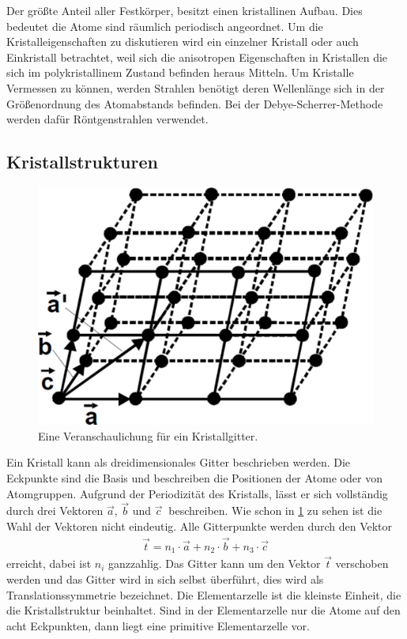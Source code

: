 Der größte Anteil aller Festkörper, besitzt einen kristallinen Aufbau. Dies bedeutet die Atome sind räumlich periodisch angeordnet. Um die Kristalleigenschaften zu diskutieren wird ein einzelner Kristall oder auch Einkristall betrachtet, weil sich die anisotropen Eigenschaften in Kristallen die sich im polykristallinem Zustand befinden heraus Mitteln. Um Kristalle Vermessen zu können, werden Strahlen benötigt deren Wellenlänge sich in der Größenordnung des Atomabstands befinden. Bei der Debye-Scherrer-Methode werden dafür Röntgenstrahlen verwendet.
\subsection{Kristallstrukturen}
\begin{figure}[h!]
	\centering
	\includegraphics[scale = 0.4]{../Grafiken/Gitter.pdf}
	\caption{Eine Veranschaulichung für ein Kristallgitter.\cite{V41}}
	\label{fig:BeispielGitter}
\end{figure}
Ein Kristall kann als dreidimensionales Gitter beschrieben werden. Die Eckpunkte sind die Basis und beschreiben die Positionen der Atome oder von Atomgruppen.
Aufgrund der Periodizität des Kristalls, lässt er sich vollständig durch drei Vektoren $\vec{a}$, $\vec{b}$ und $\vec{c}\ $ beschreiben. Wie schon in \cref{fig:BeispielGitter} zu sehen ist die Wahl der Vektoren nicht eindeutig. Alle Gitterpunkte werden durch den Vektor 
\begin{align}
	\vec{t}= n_1\cdot \vec{a} + n_2 \cdot \vec{b} + n_3 \cdot \vec{c} \label{eq:GitterVektor}
\end{align}
erreicht, dabei ist $n_i$ ganzzahlig. Das Gitter kann um den Vektor $\vec{t}$ verschoben werden und das Gitter wird in sich selbst überführt, dies wird als Translationssymmetrie bezeichnet. Die Elementarzelle ist die kleinste Einheit, die die Kristallstruktur beinhaltet. Sind in der Elementarzelle nur die Atome auf den acht Eckpunkten, dann liegt eine primitive Elementarzelle vor.\\
